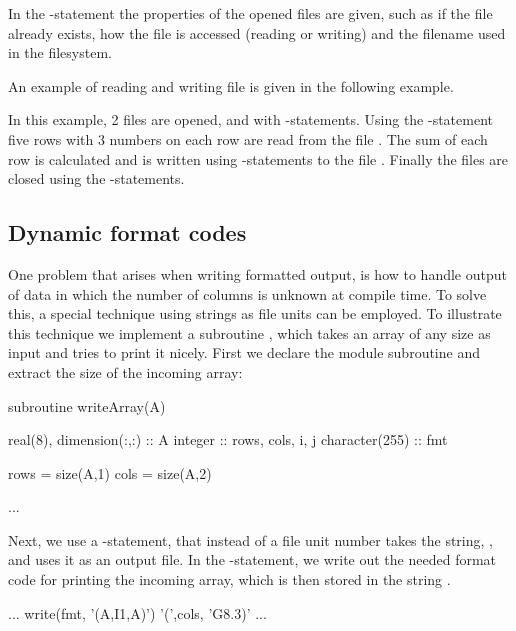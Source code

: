 In the -statement the properties of the opened files are given, such as if the file already exists, how the file is accessed (reading or writing) and the filename used in the filesystem.

An example of reading and writing file is given in the following example.


In this example, 2 files are opened,  and  with -statements. Using the -statement five rows with 3 numbers on each row are read from the file . The sum of each row is calculated and is written using -statements to the file . Finally the files are closed using the -statements.

\subsection{Dynamic format codes}

One problem that arises when writing formatted output, is how to handle output of data in which the number of columns is unknown at compile time. To solve this, a special technique using strings as file units can be employed. To illustrate this technique we implement a subroutine , which takes an array of any size as input and tries to print it nicely. First we declare the module subroutine and extract the size of the incoming array:

\begin{fortrancodeenv}
subroutine writeArray(A)
		
	real(8), dimension(:,:) :: A
	integer :: rows, cols, i, j
	character(255) :: fmt
		
	rows = size(A,1)
	cols = size(A,2)

	...
\end{fortrancodeenv}

Next, we use a -statement, that instead of a file unit number takes the string, , and uses it as an output file. In the -statement, we write out the needed format code for printing the incoming array, which is then stored in the string .

\begin{fortrancodeenv}
	...
	write(fmt, '(A,I1,A)') '(',cols, 'G8.3)'
	...
\end{fortrancodeenv}

